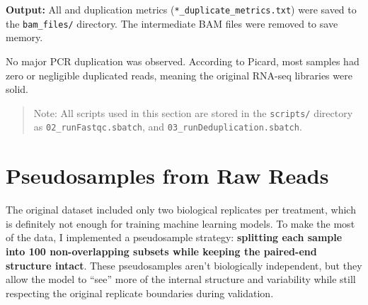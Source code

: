 \documentclass[
]{book}
\newenvironment{Shaded}{\begin{snugshade}}{\end{snugshade}}
\newcommand{\AttributeTok}[1]{\textcolor[rgb]{0.77,0.63,0.00}{#1}}
\newcommand{\BuiltInTok}[1]{#1}
\newcommand{\CommentTok}[1]{\textcolor[rgb]{0.56,0.35,0.01}{\textit{#1}}}
\newcommand{\ExtensionTok}[1]{#1}
\newcommand{\FunctionTok}[1]{\textcolor[rgb]{0.00,0.00,0.00}{#1}}
\newcommand{\NormalTok}[1]{#1}
\newcommand{\StringTok}[1]{\textcolor[rgb]{0.31,0.60,0.02}{#1}}
\newcommand{\VariableTok}[1]{\textcolor[rgb]{0.00,0.00,0.00}{#1}}
\begin{document}
\begin{Shaded}
\end{Shaded}

\textbf{Output:} All and duplication metrics (\texttt{*\_duplicate\_metrics.txt}) were saved to the \texttt{bam\_files/} directory. The intermediate BAM files were removed to save memory.

No major PCR duplication was observed. According to Picard, most samples had zero or negligible duplicated reads, meaning the original RNA-seq libraries were solid.

\begin{quote}
Note: All scripts used in this section are stored in the \texttt{scripts/} directory as \texttt{02\_runFastqc.sbatch}, and \texttt{03\_runDeduplication.sbatch}.
\end{quote}

\hypertarget{pseudosamples-from-raw-reads}{%
\chapter{Pseudosamples from Raw Reads}\label{pseudosamples-from-raw-reads}}

The original dataset included only two biological replicates per treatment, which is definitely not enough for training machine learning models. To make the most of the data, I implemented a pseudosample strategy: \textbf{splitting each sample into 100 non-overlapping subsets while keeping the paired-end structure intact}. These pseudosamples aren't biologically independent, but they allow the model to ``see'' more of the internal structure and variability while still respecting the original replicate boundaries during validation.
\end{document}
